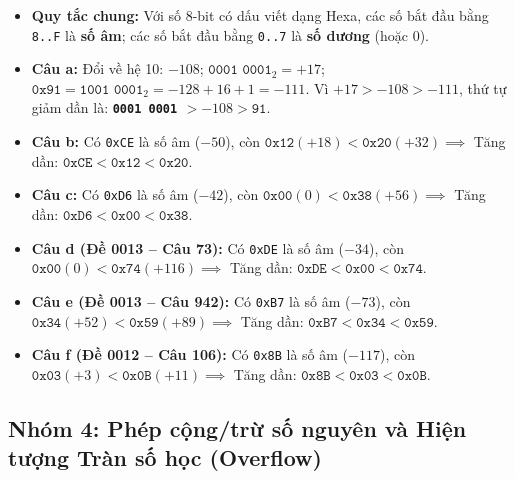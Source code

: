 \begin{itemize}
    \item \textbf{Quy tắc chung:} Với số 8-bit có dấu viết dạng Hexa, các số bắt đầu bằng \texttt{8..F} là \textbf{số âm}; các số bắt đầu bằng \texttt{0..7} là \textbf{số dương} (hoặc $0$).
    \item \textbf{Câu a:} Đổi về hệ 10: $-108$; $\texttt{0001 0001}_2 = +17$; $\texttt{0x91} = \texttt{1001 0001}_2 = -128 + 16 + 1 = -111$. Vì $+17 > -108 > -111$, thứ tự giảm dần là: \textbf{\texttt{0001 0001} $> -108 > \texttt{91}$}.
    \item \textbf{Câu b:} Có \texttt{0xCE} là số âm ($-50$), còn $\texttt{0x12} (+18) < \texttt{0x20} (+32) \implies$ Tăng dần: \textbf{$\texttt{0xCE} < \texttt{0x12} < \texttt{0x20}$}.
    \item \textbf{Câu c:} Có \texttt{0xD6} là số âm ($-42$), còn $\texttt{0x00} (0) < \texttt{0x38} (+56) \implies$ Tăng dần: \textbf{$\texttt{0xD6} < \texttt{0x00} < \texttt{0x38}$}.
    \item \textbf{Câu d (Đề 0013 -- Câu 73):} Có \texttt{0xDE} là số âm ($-34$), còn $\texttt{0x00} (0) < \texttt{0x74} (+116) \implies$ Tăng dần: \textbf{$\texttt{0xDE} < \texttt{0x00} < \texttt{0x74}$}.
    \item \textbf{Câu e (Đề 0013 -- Câu 942):} Có \texttt{0xB7} là số âm ($-73$), còn $\texttt{0x34} (+52) < \texttt{0x59} (+89) \implies$ Tăng dần: \textbf{$\texttt{0xB7} < \texttt{0x34} < \texttt{0x59}$}.
    \item \textbf{Câu f (Đề 0012 -- Câu 106):} Có \texttt{0x8B} là số âm ($-117$), còn $\texttt{0x03} (+3) < \texttt{0x0B} (+11) \implies$ Tăng dần: \textbf{$\texttt{0x8B} < \texttt{0x03} < \texttt{0x0B}$}.
\end{itemize}

\subsection{Nhóm 4: Phép cộng/trừ số nguyên và Hiện tượng Tràn số học (Overflow)}

